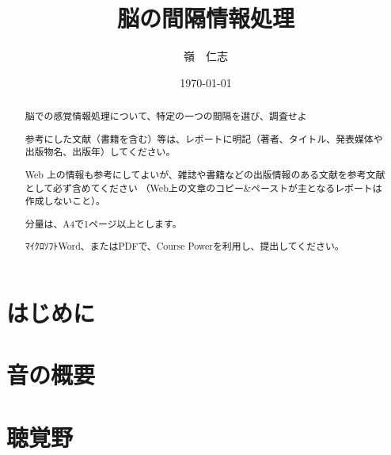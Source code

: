 \documentclass[15pt]{jarticle}
\title{脳の間隔情報処理}
\author{嶺　仁志}
\date{\today}
\begin{document}
\maketitle

\begin{abstract}
脳での感覚情報処理について、特定の一つの間隔を選び、調査せよ

参考にした文献（書籍を含む）等は、レポートに明記（著者、タイトル、発表媒体や出版物名、出版年）してください。

Web 上の情報も参考にしてよいが、雑誌や書籍などの出版情報のある文献を参考文献として必ず含めてください
（Web上の文章のコピー\&ペーストが主となるレポートは作成しないこと）。

分量は、A4で1ページ以上とします。

ﾏｲｸﾛｿﾌﾄWord、またはPDFで、Course Powerを利用し、提出してください。
\end{abstract}


\section{はじめに}

\section{音の概要}

\section{聴覚野}
\end{document}
